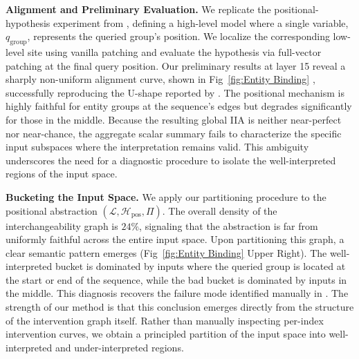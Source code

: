 
\textbf{Alignment and Preliminary Evaluation.}
We replicate the positional-hypothesis experiment from \citet{gur2025mixing}, defining a high-level model where a single variable, $q_{\mathrm{group}}$, represents the queried group's position. We localize the corresponding low-level site using vanilla patching and evaluate the hypothesis via full-vector patching at the final query position. Our preliminary results at layer 15 reveal a sharply non-uniform alignment curve, shown in Fig~\ref{fig:Entity Binding} , successfully reproducing the U-shape reported by \cite{gur2025mixing}. The positional mechanism is highly faithful for entity groups at the sequence's edges but degrades significantly for those in the middle. Because the resulting global IIA is neither near-perfect nor near-chance, the aggregate scalar summary fails to characterize the specific input subspaces where the interpretation remains valid. This ambiguity underscores the need for a diagnostic procedure to isolate the well-interpreted regions of the input space.

\textbf{Bucketing the Input Space.}
We apply our partitioning procedure to the positional abstraction $(\mathcal L, \mathcal H_{\mathrm{pos}}, \Pi)$. The overall density of the interchangeability graph is $24\%$, signaling that the abstraction is far from uniformly faithful across the entire input space. Upon partitioning this graph, a clear semantic pattern emerges (Fig~\ref{fig:Entity Binding} Upper Right). The well-interpreted bucket is dominated by inputs where the queried group is located at the start or end of the sequence, while the bad bucket is dominated by inputs in the middle. This diagnosis recovers the failure mode identified manually in \citet{gur2025mixing}. The strength of our method is that this conclusion emerges directly from the structure of the intervention graph itself. Rather than manually inspecting per-index intervention curves, we obtain a principled partition of the input space into well-interpreted and under-interpreted regions. 

